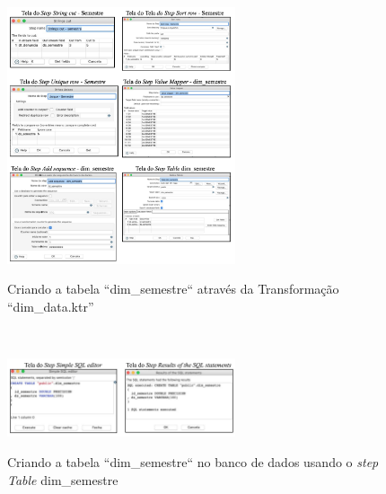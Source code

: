 \begin{figure}[H]
	\vspace*{0,2cm}
    \centering
    \caption{Criando a tabela ``dim\_semestre`` atrav\'{e}s da Transforma\c{c}\~{a}o ``dim\_data.ktr''}
    \includegraphics[width=0.6\textwidth]{./04-figuras/figura-dim-semestre}
    \label{fig:ilustfigdimsemestre}
\end{figure}
\vspace*{-0,9cm}
{\raggedright {}} \\

\begin{figure}[H]
	\vspace*{0,2cm}
    \centering
    \caption{Criando a tabela ``dim\_semestre`` no banco de dados usando o \textit{step Table} dim\_semestre}
    \includegraphics[width=0.6\textwidth]{./04-figuras/figura-tb-dim-semestre}
    \label{fig:ilustfigtbdimsemestre}
\end{figure}
\vspace*{-0,9cm}
{\raggedright {}} \\

